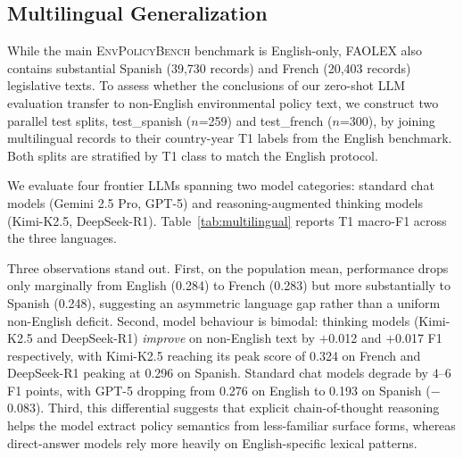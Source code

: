 \documentclass[11pt]{article}
\newcommand{\bench}{\textsc{EnvPolicyBench}}
\begin{document}
\subsection{Multilingual Generalization}
\label{sec:multilingual}

While the main \bench{} benchmark is English-only, FAOLEX also contains
substantial Spanish (39{,}730 records) and French (20{,}403 records)
legislative texts. To assess whether the conclusions of our zero-shot LLM
evaluation transfer to non-English environmental policy text, we construct
two parallel test splits, test\_spanish ($n$=259) and
test\_french ($n$=300), by joining multilingual records to their
country-year T1 labels from the English benchmark. Both splits are
stratified by T1 class to match the English protocol.

We evaluate four frontier LLMs spanning two model categories: standard
chat models (Gemini 2.5 Pro, GPT-5) and reasoning-augmented thinking
models (Kimi-K2.5, DeepSeek-R1). Table~\ref{tab:multilingual} reports
T1 macro-F1 across the three languages.

\begin{table}[!t]
\centering\small
\setlength{\tabcolsep}{4pt}
\caption{Multilingual evaluation of zero-shot LLMs on FAOLEX policy texts. $\Delta$ reports average non-English performance relative to English. $^\star$ denotes reasoning-augmented models.}
\label{tab:multilingual}
\end{table}

Three observations stand out. First, on the population mean, performance drops only marginally from English (0.284) to French (0.283) but more substantially to Spanish (0.248), suggesting an asymmetric language gap rather than a uniform non-English deficit. Second, model behaviour is bimodal: thinking models (Kimi-K2.5 and DeepSeek-R1) \emph{improve} on non-English text by $+$0.012 and $+$0.017 F1 respectively, with Kimi-K2.5 reaching its peak score of 0.324 on French and DeepSeek-R1 peaking at 0.296 on Spanish. Standard chat models degrade by $4$--$6$ F1 points, with GPT-5 dropping from 0.276
on English to 0.193 on Spanish ($-$0.083). Third, this differential suggests that explicit chain-of-thought reasoning helps the model extract policy semantics from less-familiar surface forms, whereas direct-answer models rely more heavily on English-specific lexical patterns.
\end{document}
